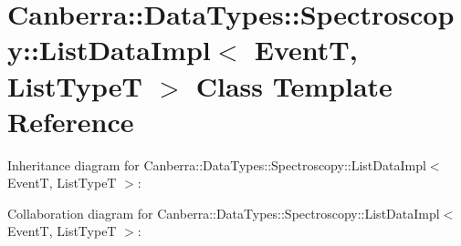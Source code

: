 \hypertarget{class_canberra_1_1_data_types_1_1_spectroscopy_1_1_list_data_impl}{}\section{Canberra\+:\+:Data\+Types\+:\+:Spectroscopy\+:\+:List\+Data\+Impl$<$ EventT, List\+TypeT $>$ Class Template Reference}
\label{class_canberra_1_1_data_types_1_1_spectroscopy_1_1_list_data_impl}


Inheritance diagram for Canberra\+:\+:Data\+Types\+:\+:Spectroscopy\+:\+:List\+Data\+Impl$<$ EventT, List\+TypeT $>$\+:


Collaboration diagram for Canberra\+:\+:Data\+Types\+:\+:Spectroscopy\+:\+:List\+Data\+Impl$<$ EventT, List\+TypeT $>$\+:
